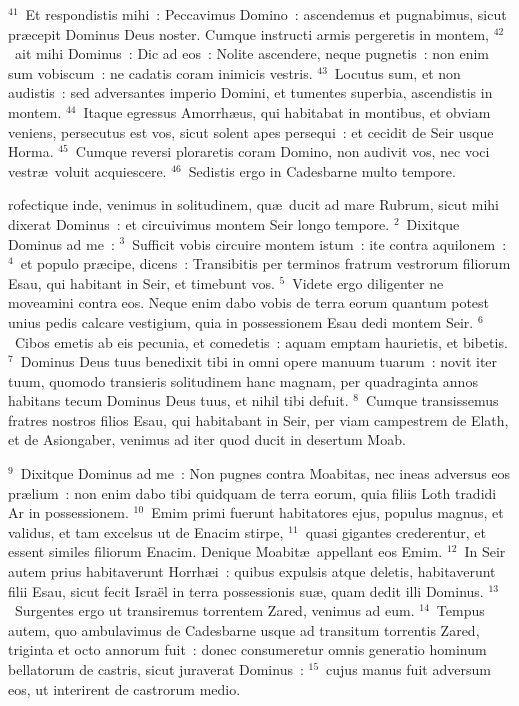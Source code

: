${}^{41}$~Et respondistis mihi~: Peccavimus Domino~: ascendemus et pugnabimus, sicut pr\ae cepit Dominus Deus noster. Cumque instructi armis pergeretis in montem,
${}^{42}$~ait mihi Dominus~: Dic ad eos~: Nolite ascendere, neque pugnetis~: non enim sum vobiscum~: ne cadatis coram inimicis vestris.
${}^{43}$~Locutus sum, et non audistis~: sed adversantes imperio Domini, et tumentes superbia, ascendistis in montem.
${}^{44}$~Itaque egressus Amorrh\ae us, qui habitabat in montibus, et obviam veniens, persecutus est vos, sicut solent apes persequi~: et cecidit de Seir usque Horma.
${}^{45}$~Cumque reversi ploraretis coram Domino, non audivit vos, nec voci vestr\ae\ voluit acquiescere.
${}^{46}$~Sedistis ergo in Cadesbarne multo tempore.

\bchapter
{}rofectique inde, venimus in solitudinem, qu\ae\ ducit ad mare Rubrum, sicut mihi dixerat Dominus~: et circuivimus montem Seir longo tempore.
${}^{2}$~Dixitque Dominus ad me~:
${}^{3}$~Sufficit vobis circuire montem istum~: ite contra aquilonem~:
${}^{4}$~et populo pr\ae cipe, dicens~: Transibitis per terminos fratrum vestrorum filiorum Esau, qui habitant in Seir, et timebunt vos.
${}^{5}$~Videte ergo diligenter ne moveamini contra eos. Neque enim dabo vobis de terra eorum quantum potest unius pedis calcare vestigium, quia in possessionem Esau dedi montem Seir.
${}^{6}$~Cibos emetis ab eis pecunia, et comedetis~: aquam emptam haurietis, et bibetis.
${}^{7}$~Dominus Deus tuus benedixit tibi in omni opere manuum tuarum~: novit iter tuum, quomodo transieris solitudinem hanc magnam, per quadraginta annos habitans tecum Dominus Deus tuus, et nihil tibi defuit.
${}^{8}$~Cumque transissemus fratres nostros filios Esau, qui habitabant in Seir, per viam campestrem de Elath, et de Asiongaber, venimus ad iter quod ducit in desertum Moab.


${}^{9}$~Dixitque Dominus ad me~: Non pugnes contra Moabitas, nec ineas adversus eos pr\ae lium~: non enim dabo tibi quidquam de terra eorum, quia filiis Loth tradidi Ar in possessionem.
${}^{10}$~Emim primi fuerunt habitatores ejus, populus magnus, et validus, et tam excelsus ut de Enacim stirpe,
${}^{11}$~quasi gigantes crederentur, et essent similes filiorum Enacim. Denique Moabit\ae\ appellant eos Emim.
${}^{12}$~In Seir autem prius habitaverunt Horrh\ae i~: quibus expulsis atque deletis, habitaverunt filii Esau, sicut fecit Isra\"el in terra possessionis su\ae , quam dedit illi Dominus.
${}^{13}$~Surgentes ergo ut transiremus torrentem Zared, venimus ad eum.
${}^{14}$~Tempus autem, quo ambulavimus de Cadesbarne usque ad transitum torrentis Zared, triginta et octo annorum fuit~: donec consumeretur omnis generatio hominum bellatorum de castris, sicut juraverat Dominus~:
${}^{15}$~cujus manus fuit adversum eos, ut interirent de castrorum medio.


